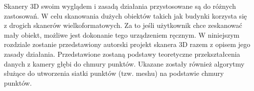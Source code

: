 Skanery 3D swoim wyglądem i zasadą działania przystosowane są do różnych zastosowań. W celu skanowania dużych obiektów takich jak budynki korzysta się z drogich skanerów wielkoformatowych. Za to jeśli użytkownik chce zeskanować mały obiekt, możliwe jest dokonanie tego urządzeniem ręcznym. W niniejszym rozdziale zostanie przedstawiony autorski projekt skanera 3D razem z opisem jego zasady działania. Przedstawione zostaną podstawy teoretyczne przekształcenia danych z kamery głębi do chmury punktów. Ukazane zostały również algorytmy służące do utworzenia siatki punktów (tzw. meshu) na podstawie chmury punktów.
